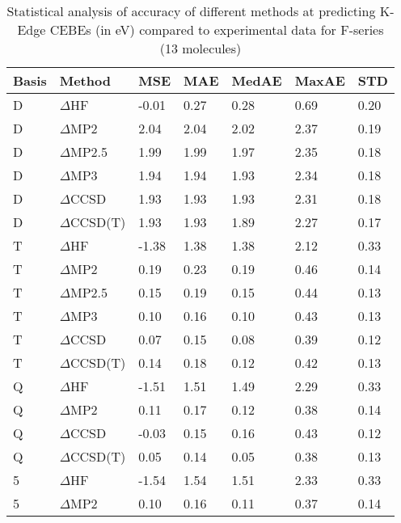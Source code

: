 \begin{table}
  \caption{Statistical analysis of accuracy of different methods at predicting K-Edge CEBEs (in eV) compared to experimental data for F-series (13 molecules)}
  \label{tbl:summary-f}
  \begin{tabular}{l l l l l l l }
    \toprule
    \textbf{Basis} & \textbf{Method} & \textbf{MSE} & \textbf{MAE} & \textbf{MedAE} & \textbf{MaxAE} & \textbf{STD} \\ 
    \midrule
    D & $\Delta$HF & -0.01 & 0.27 & 0.28 & 0.69 & 0.20 \\ 
    D & $\Delta$MP2 & 2.04 & 2.04 & 2.02 & 2.37 & 0.19 \\ 
    D & $\Delta$MP2.5 & 1.99 & 1.99 & 1.97 & 2.35 & 0.18 \\ 
    D & $\Delta$MP3 & 1.94 & 1.94 & 1.93 & 2.34 & 0.18 \\ 
    D & $\Delta$CCSD & 1.93 & 1.93 & 1.93 & 2.31 & 0.18 \\ 
    D & $\Delta$CCSD(T) & 1.93 & 1.93 & 1.89 & 2.27 & 0.17 \\ 
    T & $\Delta$HF & -1.38 & 1.38 & 1.38 & 2.12 & 0.33 \\ 
    T & $\Delta$MP2 & 0.19 & 0.23 & 0.19 & 0.46 & 0.14 \\ 
    T & $\Delta$MP2.5 & 0.15 & 0.19 & 0.15 & 0.44 & 0.13 \\ 
    T & $\Delta$MP3 & 0.10 & 0.16 & 0.10 & 0.43 & 0.13 \\ 
    T & $\Delta$CCSD & 0.07 & 0.15 & 0.08 & 0.39 & 0.12 \\ 
    T & $\Delta$CCSD(T) & 0.14 & 0.18 & 0.12 & 0.42 & 0.13 \\ 
    Q & $\Delta$HF & -1.51 & 1.51 & 1.49 & 2.29 & 0.33 \\ 
    Q & $\Delta$MP2 & 0.11 & 0.17 & 0.12 & 0.38 & 0.14 \\ 
    Q & $\Delta$CCSD & -0.03 & 0.15 & 0.16 & 0.43 & 0.12 \\ 
    Q & $\Delta$CCSD(T) & 0.05 & 0.14 & 0.05 & 0.38 & 0.13 \\ 
    5 & $\Delta$HF & -1.54 & 1.54 & 1.51 & 2.33 & 0.33 \\ 
    5 & $\Delta$MP2 & 0.10 & 0.16 & 0.11 & 0.37 & 0.14 \\ 
    \bottomrule
  \end{tabular}
\end{table}
